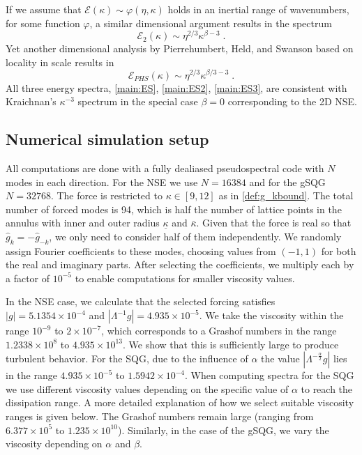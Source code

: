 \documentclass[twoside, reqno]{amsart}
\numberwithin{lemma}{section}
\numberwithin{theorem}{section}
\numberwithin{proposition}{section}
\numberwithin{equation}{section} %
\newcommand{\ka}{\kappa}
\newcommand{\bkap}{\bar{\kap}}
\newcommand{\kapb}{\underline{\kap}}
\newcommand{\Ecal}{\mathcal{E}}
\newcommand{\be}{\beta}
\newcommand{\kap}{\kappa}
\begin{document}
If we assume that 
$\mathcal{E}(\kappa) \sim \varphi(\eta, \ka)$
{holds} in an inertial range of { wavenumbers}, for some function $\varphi$, a similar dimensional argument results in the spectrum
    \begin{equation} \label{main:ES2}
    {\mathcal{E}_2}(\kappa) \sim \eta^{2/3}\ka^{\beta-3} \;.
    \end{equation}
Yet another dimensional analysis by Pierrehumbert, Held, and Swanson \cite{Pierrehumbert1994} based on locality in scale results in 
    \begin{equation} \label{main:ES3}
    {\Ecal_{PHS}}(\kappa) \sim \eta^{2/3}\ka^{\beta/3-3} \;.
    \end{equation}
All three {energy spectra, \eqref{main:ES}, \eqref{main:ES2}, \eqref{main:ES3}, are consistent} with Kraichnan's $\kappa^{-3}$ spectrum
in the {special case $\be=0$ corresponding to} the 2D NSE. 

\subsection{Numerical simulation setup}
All computations are done with a fully dealiased pseudospectral code with $N$ modes in each direction.  For the NSE we use $N=16384$ and for the gSQG $N=32768$.  The force is restricted to  $\kappa \in [9,12]$  as in \eqref{def:g_kbound}. The total number of forced modes is 94, which is half the number of lattice points in the annulus with inner and outer radius ${\kapb}$ and $\bkap$. Given that the force is real so that $\hat{g}_k = -\hat{g}_{-k}$, we only need to consider half of them independently.
We randomly assign Fourier coefficients to these modes, choosing values from $(-1,1)$ for both the real and imaginary parts. After selecting the coefficients, we multiply each by a factor of $10^{-5}$ to enable computations for smaller viscosity values.

In the NSE case, we calculate that the selected forcing satisfies $ |g| = 5.1354 \times 10^{-4} $ and $ |\Lambda^{-1} g| = 4.935 \times 10^{-5} $. We take the viscosity within the range $ 10^{-9} $ to $ 2 \times 10^{-7} $, which corresponds to a Grashof numbers in the range $ 1.2338 \times 10^{8} $ to $ 4.935 \times 10^{13} $. We show that this is sufficiently large to produce turbulent behavior. For the SQG, due to the influence of $\alpha$ the value $ |\Lambda^{-\frac{\alpha}{2}} g| $ lies in the range $ 4.935 \times 10^{-5} $ to $1.5942 \times 10^{-4}$.  When computing spectra for the SQG we use different viscosity values depending on the specific value of $\alpha$ to reach the dissipation range.  A more detailed explanation of how we select suitable viscosity ranges is given below. The Grashof numbers remain large (ranging from $ 6.377 \times 10^5 $ to $ 1.235 \times 10^{10} $). Similarly, in the case of the gSQG, we vary the viscosity depending on $ \alpha $ and $ \beta $. 
\end{document}
